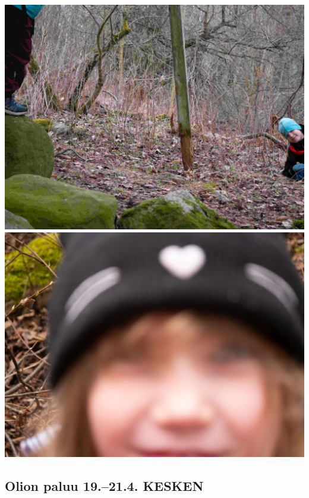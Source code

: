 \documentclass[10pt,finnish,a5paper,headings=small,twoside=semi]{scrartcl}
\begin{document}
\begin{multicols}{2}
	\noindent\includegraphics[width=0.9\linewidth]{assets/kolkkienpäiväretki11}
	\noindent\includegraphics[width=0.9\linewidth]{assets/kolkkienpäiväretki12}

\end{multicols}

\clearpage
\subsection{Olion paluu 19.--21.4. KESKEN}
\end{document}
